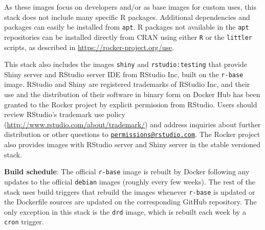 As these images focus on developers and/or as base images for custom
uses, this stack does not include many specific R packages. Additional
dependencies and packages can easily be installed from \texttt{apt}. R
packages not available in the \texttt{apt} repositories can be installed
directly from CRAN using either \texttt{R} or the \texttt{littler}
scripts, as described in \url{https://rocker-project.org/use}.

This stack also includes the images \texttt{shiny} and
\texttt{rstudio:testing} that provide Shiny server and
RStudio\textsuperscript{\textregistered} server IDE from
RStudio\textsuperscript{\textregistered} Inc, built on the
\texttt{r-base} image. RStudio\textsuperscript{\textregistered} and
Shiny are registered trademarks of RStudio Inc, and their use and the
distribution of their software in binary form on Docker Hub has been
granted to the Rocker project by explicit permission from RStudio. Users
should review RStudio\textsuperscript{\textregistered}'s trademark use
policy (\url{http://www.rstudio.com/about/trademark/}) and address
inquiries about further distribution or other questions to
\href{mailto:permissions@rstudio.com}{\nolinkurl{permissions@rstudio.com}}.
The Rocker project also provides images with
RStudio\textsuperscript{\textregistered} server and Shiny server in the
stable versioned stack.

\textbf{Build schedule}: The official \texttt{r-base} image is rebuilt
by Docker following any updates to the official \texttt{debian} images
(roughly every few weeks). The rest of the stack uses build triggers
that rebuild the images whenever \texttt{r-base} is updated or the
Dockerfile sources are updated on the corresponding GitHub repository.
The only exception in this stack is the \texttt{drd} image, which is
rebuilt each week by a \texttt{cron} trigger.

